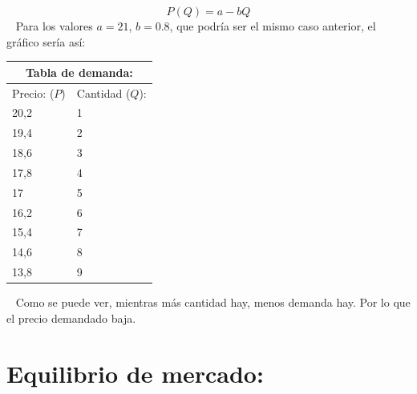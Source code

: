 \documentclass[
  letterpaper,
  DIV=11,
  numbers=noendperiod]{scrreport}
\begin{document}
\[
P(Q)=a-bQ
\] ~ Para los valores \(a=21\), \(b=0.8\), que podría ser el mismo caso
anterior, el gráfico sería así:

\begin{multicols}{2}

\begin{table}[H]
    \centering
    \begin{tabular}{|p{25mm}|p{25mm}|}
        \multicolumn{2}{c}{Tabla de demanda:} \\
        \hline
        Precio: ($P$) & Cantidad ($Q$): \\ \hline
        20,2 & 1 \\ \hline
        19,4 & 2 \\ \hline
        18,6 & 3 \\ \hline
        17,8 & 4 \\ \hline
        17 & 5 \\ \hline
        16,2 & 6 \\ \hline
        15,4 & 7 \\ \hline
        14,6 & 8 \\ \hline
        13,8 & 9 \\ \hline
        \end{tabular}
\end{table}

\begin{center}
\end{center}

\end{multicols}

~ Como se puede ver, mientras más cantidad hay, menos demanda hay. Por
lo que el precio demandado baja.

\hypertarget{equilibrio-de-mercado}{%
\section{Equilibrio de mercado:}\label{equilibrio-de-mercado}}
\end{document}
